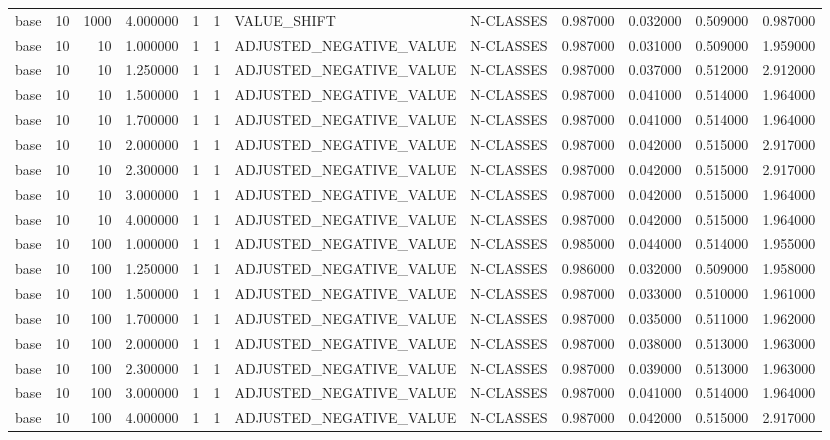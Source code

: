 \begin{tabular}{lrrrllllrrrr}
base & 10 & 1000 & 4.000000 & 1 & 1 & VALUE_SHIFT & N-CLASSES & 0.987000 & 0.032000 & 0.509000 & 0.987000 \\
base & 10 & 10 & 1.000000 & 1 & 1 & ADJUSTED_NEGATIVE_VALUE & N-CLASSES & 0.987000 & 0.031000 & 0.509000 & 1.959000 \\
base & 10 & 10 & 1.250000 & 1 & 1 & ADJUSTED_NEGATIVE_VALUE & N-CLASSES & 0.987000 & 0.037000 & 0.512000 & 2.912000 \\
base & 10 & 10 & 1.500000 & 1 & 1 & ADJUSTED_NEGATIVE_VALUE & N-CLASSES & 0.987000 & 0.041000 & 0.514000 & 1.964000 \\
base & 10 & 10 & 1.700000 & 1 & 1 & ADJUSTED_NEGATIVE_VALUE & N-CLASSES & 0.987000 & 0.041000 & 0.514000 & 1.964000 \\
base & 10 & 10 & 2.000000 & 1 & 1 & ADJUSTED_NEGATIVE_VALUE & N-CLASSES & 0.987000 & 0.042000 & 0.515000 & 2.917000 \\
base & 10 & 10 & 2.300000 & 1 & 1 & ADJUSTED_NEGATIVE_VALUE & N-CLASSES & 0.987000 & 0.042000 & 0.515000 & 2.917000 \\
base & 10 & 10 & 3.000000 & 1 & 1 & ADJUSTED_NEGATIVE_VALUE & N-CLASSES & 0.987000 & 0.042000 & 0.515000 & 1.964000 \\
base & 10 & 10 & 4.000000 & 1 & 1 & ADJUSTED_NEGATIVE_VALUE & N-CLASSES & 0.987000 & 0.042000 & 0.515000 & 1.964000 \\
base & 10 & 100 & 1.000000 & 1 & 1 & ADJUSTED_NEGATIVE_VALUE & N-CLASSES & 0.985000 & 0.044000 & 0.514000 & 1.955000 \\
base & 10 & 100 & 1.250000 & 1 & 1 & ADJUSTED_NEGATIVE_VALUE & N-CLASSES & 0.986000 & 0.032000 & 0.509000 & 1.958000 \\
base & 10 & 100 & 1.500000 & 1 & 1 & ADJUSTED_NEGATIVE_VALUE & N-CLASSES & 0.987000 & 0.033000 & 0.510000 & 1.961000 \\
base & 10 & 100 & 1.700000 & 1 & 1 & ADJUSTED_NEGATIVE_VALUE & N-CLASSES & 0.987000 & 0.035000 & 0.511000 & 1.962000 \\
base & 10 & 100 & 2.000000 & 1 & 1 & ADJUSTED_NEGATIVE_VALUE & N-CLASSES & 0.987000 & 0.038000 & 0.513000 & 1.963000 \\
base & 10 & 100 & 2.300000 & 1 & 1 & ADJUSTED_NEGATIVE_VALUE & N-CLASSES & 0.987000 & 0.039000 & 0.513000 & 1.963000 \\
base & 10 & 100 & 3.000000 & 1 & 1 & ADJUSTED_NEGATIVE_VALUE & N-CLASSES & 0.987000 & 0.041000 & 0.514000 & 1.964000 \\
base & 10 & 100 & 4.000000 & 1 & 1 & ADJUSTED_NEGATIVE_VALUE & N-CLASSES & 0.987000 & 0.042000 & 0.515000 & 2.917000 \\

\end{tabular}
